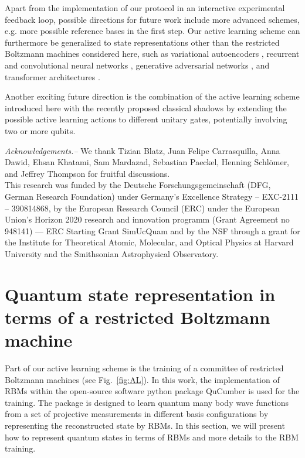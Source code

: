 \documentclass[pra,aps,showpacs,groupedaddress,superscriptaddress,twocolumn,toc=flat,biblatex,footinbib]{revtex4-1}
\begin{document}
Apart from the implementation of our protocol in an interactive experimental feedback loop, possible directions for future work include more advanced schemes, e.g. more possible reference bases in the first step. Our active learning scheme can furthermore be generalized to state representations other than the restricted Boltzmann machines considered here, such as variational autoencoders \cite{Rocchetto2018}, recurrent \cite{Morawetz2021} and convolutional neural networks \cite{Schmale2021}, generative adversarial networks \cite{Ahmed2021}, and transformer architectures \cite{Cha2021}.


Another exciting future direction is the combination of the active learning scheme introduced here with the recently proposed classical shadows \cite{Huang2020} by extending the possible active learning actions to different unitary gates, potentially involving two or more qubits.\\  

\vspace{0.5cm}


\emph{Acknowledgements.--}
We thank Tizian Blatz, Juan Felipe Carrasquilla, Anna Dawid, Ehsan Khatami, Sam Mardazad, Sebastian Paeckel, Henning Schlömer, and Jeffrey Thompson for fruitful discussions. \\
This research was funded by the Deutsche Forschungsgemeinschaft (DFG, German Research Foundation) under Germany's Excellence Strategy -- EXC-2111 -- 390814868, by the European Research Council (ERC) under the European Union’s Horizon 2020 research and innovation programm (Grant Agreement no 948141) — ERC Starting Grant SimUcQuam and by the NSF through a grant for the Institute for Theoretical Atomic, Molecular, and Optical Physics at Harvard University and the Smithsonian Astrophysical Observatory.







\clearpage

\appendix 
\section{Quantum state representation in terms of a restricted Boltzmann machine \label{appendix:RBM}}
Part of our active learning scheme is the training of a committee of restricted Boltzmann machines (see Fig.~\ref{fig:AL}). In this work, the implementation of RBMs within the open-source software python package QuCumber \cite{Qucumber2019} is used for the training. The package is designed to learn quantum many body wave functions from a set of projective measurements in different basis configurations by representing the reconstructed state by RBMs. In this section, we will present how to represent quantum states in terms of RBMs and more details to the RBM training.\\
\end{document}
